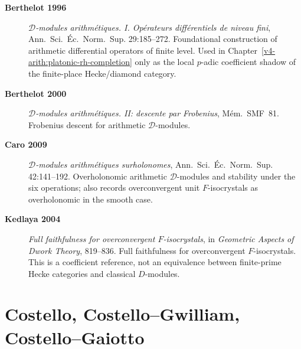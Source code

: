 \begin{description}
\item[\textbf{Berthelot 1996}] \emph{\(\mathcal{D}\)-modules
arithm\'etiques. I. Op\'erateurs diff\'erentiels de niveau fini},
Ann.~Sci.~\'Ec.~Norm.~Sup. 29:185--272. Foundational construction
of arithmetic differential operators of finite level. Used in
Chapter~\ref{v4-arith:platonic-rh-completion} only as the local
\(p\)-adic coefficient shadow of the finite-place Hecke/diamond
category.
\item[\textbf{Berthelot 2000}] \emph{\(\mathcal{D}\)-modules
arithm\'etiques. II: descente par Frobenius}, M\'em.~SMF~81.
Frobenius descent for arithmetic \(\mathcal{D}\)-modules.
\item[\textbf{Caro 2009}] \emph{\(\mathcal{D}\)-modules arithm\'etiques
surholonomes}, Ann.~Sci.~\'Ec.~Norm.~Sup. 42:141--192.
Overholonomic arithmetic \(\mathcal{D}\)-modules and stability under
the six operations; also records overconvergent unit
\(F\)-isocrystals as overholonomic in the smooth case.
\item[\textbf{Kedlaya 2004}] \emph{Full faithfulness for
overconvergent \(F\)-isocrystals}, in \emph{Geometric Aspects of Dwork
Theory}, 819--836. Full faithfulness for overconvergent
\(F\)-isocrystals. This is a coefficient reference, not an equivalence
between finite-prime Hecke categories and classical \(D\)-modules.
\end{description}

\section{Costello, Costello--Gwilliam, Costello--Gaiotto}
\label{v4-arith:app:A:costello}

